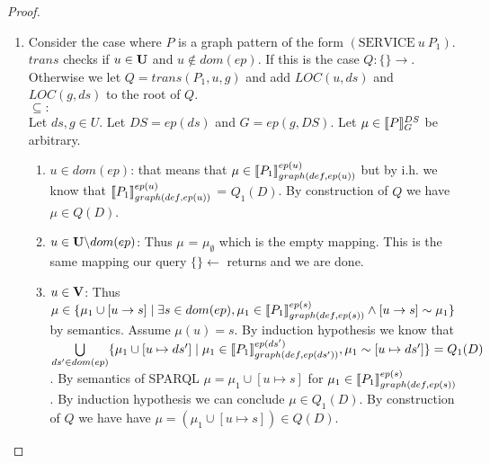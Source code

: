 \begin{proof}
\begin{enumerate}
		\item Consider the case where $P$ is a graph 
			pattern of the form $(\mbox{SERVICE} \ u \ P_1)$.
			$trans$ checks if $u \in \mathbf{U}$ and $u \notin dom(ep)$. If this is the
			case $Q: \{\} \rightarrow$. Otherwise we let $Q = trans(P_1,u,g)$
			and add $LOC(u,ds)$ and $LOC(g,ds)$ to the root of $Q$.\\
			$\subseteq:$\\
			Let $ds,g \in U$. Let $DS = ep(ds)$ and $G = ep(g,DS)$.
			Let $\mu \in \llbracket P \rrbracket^{DS}_{G}$ be arbitrary.
			\begin{enumerate}
				\item  $u \in dom(ep)$:
					that means that $\mu \in \llbracket P_1
					\rrbracket^{ep(u)}_{graph(def,ep(u))}$
					but by i.h. we know that 
					$\llbracket P_1 \rrbracket^{ep(u)}_{graph(def,ep(u))}$ =
					$Q_1(D)$.
					By construction of $Q$ we have $\mu \in Q(D)$.
				\item $u \in \mathbf{U}\backslash dom(ep)$:
					Thus $\mu$ = $\mu_\emptyset$ which is the empty
					mapping. This is the same mapping our query
					$\{\} \leftarrow$ returns and we are
					done.
				\item $u \in \mathbf{V}$:
					Thus $\mu \in \{ \mu_1 \cup [u \rightarrow s ] \mid
						\exists s \in dom(ep), \mu_1 \in \llbracket P_1
						\rrbracket^{ep(s)}_{graph(def,ep(s))} \land
					[u \rightarrow s] \sim \mu_1 \}$ by semantics. 
					Assume $\mu(u) = s$.
					By induction hypothesis we know that 
					$\bigcup\limits_{ds' \in dom(ep)} \{ \mu_1 \cup [u
						\mapsto ds'] \mid \mu_1 \in
						\llbracket P_1\rrbracket^{ep(ds')}_{graph(def,ep(ds'))},
					\mu_1 \sim [u\mapsto ds'] \}  =
					Q_1(D) $. By semantics of SPARQL $\mu = \mu_1 \cup
					[u \mapsto s]$ 
					for $\mu_1 \in \llbracket P_1 \rrbracket^{ep(s)}_{graph(def,ep(s))}$. 
					By induction hypothesis we can conclude
					$\mu \in Q_1(D)$.
					By construction of $Q$ we have have $\mu = (\mu_1 \cup [u
					\mapsto s])	\in Q(D)$. 
			\end{enumerate}


\end{enumerate}
\end{proof}
